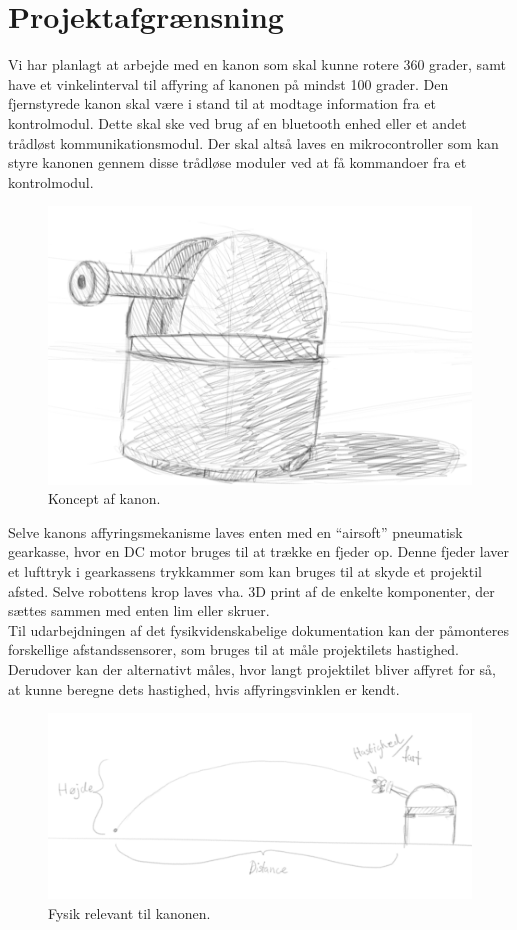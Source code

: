 \section{Projektafgrænsning}

Vi har planlagt at arbejde med en kanon som skal kunne rotere 360 grader, samt have et vinkelinterval til affyring af kanonen på mindst 100 grader. Den fjernstyrede kanon skal være i stand til at modtage information fra et kontrolmodul. Dette skal ske ved brug af en bluetooth enhed eller et andet trådløst kommunikationsmodul. Der skal altså laves en mikrocontroller som kan styre kanonen gennem disse trådløse moduler ved at få kommandoer fra et kontrolmodul.\\

\begin{figure}[H]
\centering
\includegraphics[scale=0.4]{Billeder/Koncept_turret.png}
\caption{Koncept af kanon.}
\label{fig:KonceptKanon}
\end{figure}

Selve kanons affyringsmekanisme laves enten med en “airsoft” pneumatisk gearkasse, hvor en DC motor bruges til at trække en fjeder op. Denne fjeder laver et lufttryk i gearkassens trykkammer som kan bruges til at skyde et projektil afsted. Selve robottens krop laves vha. 3D print af de enkelte komponenter, der sættes sammen med enten lim eller skruer. \\

Til udarbejdningen af det fysikvidenskabelige dokumentation kan der påmonteres forskellige afstandssensorer, som bruges til at måle projektilets hastighed. Derudover kan der alternativt måles, hvor langt projektilet bliver affyret for så, at kunne beregne dets hastighed, hvis affyringsvinklen er kendt.

\begin{figure}[H]
\centering
\includegraphics[scale=0.4]{Billeder/Fysik_koncept.png}
\caption{Fysik relevant til kanonen.}
\label{fig:FysikKoncept}
\end{figure}